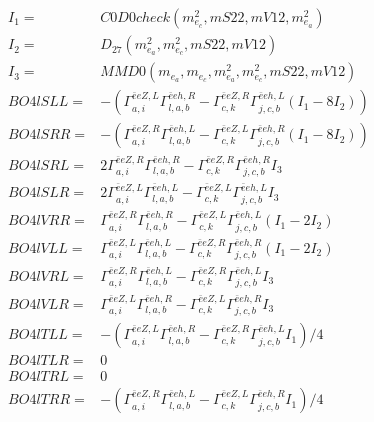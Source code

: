 \documentclass[A4,landscape]{article}
\begin{document}
\begin{align} 
I_1 = & C0D0check(m^2_{e_{{c}}}, mS22, mV12, m^2_{e_{{a}}}) \\ 
I_2 = & D_{27}(m^2_{e_{{a}}}, m^2_{e_{{c}}}, mS22, mV12) \\ 
I_3 = & MMD0(m_{e_{{a}}}, m_{e_{{c}}}, m^2_{e_{{a}}}, m^2_{e_{{c}}}, mS22, mV12) \\ 
  BO4lSLL= & -( \Gamma^{\bar{e}e Z ,L}_{a, i} \Gamma^{\bar{e}e h ,R}_{l, a, b} - \Gamma^{\bar{e}e Z ,R} _{c, k} \Gamma^{\bar{e}e h ,L}_{j, c, b} (I_1 - 8 I_2)) \\ 
  BO4lSRR= & -( \Gamma^{\bar{e}e Z ,R}_{a, i} \Gamma^{\bar{e}e h ,L}_{l, a, b} - \Gamma^{\bar{e}e Z ,L} _{c, k} \Gamma^{\bar{e}e h ,R}_{j, c, b} (I_1 - 8 I_2)) \\ 
  BO4lSRL= & 2  \Gamma^{\bar{e}e Z ,R}_{a, i} \Gamma^{\bar{e}e h ,R}_{l, a, b} - \Gamma^{\bar{e}e Z ,R} _{c, k} \Gamma^{\bar{e}e h ,R}_{j, c, b} I_3 \\ 
  BO4lSLR= & 2  \Gamma^{\bar{e}e Z ,L}_{a, i} \Gamma^{\bar{e}e h ,L}_{l, a, b} - \Gamma^{\bar{e}e Z ,L} _{c, k} \Gamma^{\bar{e}e h ,L}_{j, c, b} I_3 \\ 
  BO4lVRR= &  \Gamma^{\bar{e}e Z ,R}_{a, i} \Gamma^{\bar{e}e h ,R}_{l, a, b} - \Gamma^{\bar{e}e Z ,L} _{c, k} \Gamma^{\bar{e}e h ,L}_{j, c, b} (I_1 - 2 I_2) \\ 
  BO4lVLL= &  \Gamma^{\bar{e}e Z ,L}_{a, i} \Gamma^{\bar{e}e h ,L}_{l, a, b} - \Gamma^{\bar{e}e Z ,R} _{c, k} \Gamma^{\bar{e}e h ,R}_{j, c, b} (I_1 - 2 I_2) \\ 
  BO4lVRL= &  \Gamma^{\bar{e}e Z ,R}_{a, i} \Gamma^{\bar{e}e h ,L}_{l, a, b} - \Gamma^{\bar{e}e Z ,R} _{c, k} \Gamma^{\bar{e}e h ,L}_{j, c, b} I_3 \\ 
  BO4lVLR= &  \Gamma^{\bar{e}e Z ,L}_{a, i} \Gamma^{\bar{e}e h ,R}_{l, a, b} - \Gamma^{\bar{e}e Z ,L} _{c, k} \Gamma^{\bar{e}e h ,R}_{j, c, b} I_3 \\ 
  BO4lTLL= & -( \Gamma^{\bar{e}e Z ,L}_{a, i} \Gamma^{\bar{e}e h ,R}_{l, a, b} - \Gamma^{\bar{e}e Z ,R} _{c, k} \Gamma^{\bar{e}e h ,L}_{j, c, b} I_1)/4 \\ 
  BO4lTLR= & 0 \\ 
  BO4lTRL= & 0 \\ 
  BO4lTRR= & -( \Gamma^{\bar{e}e Z ,R}_{a, i} \Gamma^{\bar{e}e h ,L}_{l, a, b} - \Gamma^{\bar{e}e Z ,L} _{c, k} \Gamma^{\bar{e}e h ,R}_{j, c, b} I_1)/4 \\ 
\end{align} 
\end{document}

